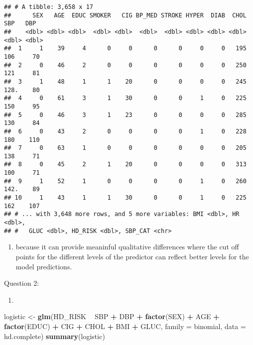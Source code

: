 \documentclass[
]{article}
\newenvironment{Shaded}{\begin{snugshade}}{\end{snugshade}}
\newcommand{\DataTypeTok}[1]{\textcolor[rgb]{0.13,0.29,0.53}{#1}}
\newcommand{\KeywordTok}[1]{\textcolor[rgb]{0.13,0.29,0.53}{\textbf{#1}}}
\newcommand{\NormalTok}[1]{#1}
\newcommand{\OperatorTok}[1]{\textcolor[rgb]{0.81,0.36,0.00}{\textbf{#1}}}
\newcommand{\StringTok}[1]{\textcolor[rgb]{0.31,0.60,0.02}{#1}}
\providecommand{\tightlist}{%
  \setlength{\itemsep}{0pt}\setlength{\parskip}{0pt}}
\begin{document}
\begin{verbatim}
## # A tibble: 3,658 x 17
##      SEX   AGE  EDUC SMOKER   CIG BP_MED STROKE HYPER  DIAB  CHOL   SBP   DBP
##    <dbl> <dbl> <dbl>  <dbl> <dbl>  <dbl>  <dbl> <dbl> <dbl> <dbl> <dbl> <dbl>
##  1     1    39     4      0     0      0      0     0     0   195  106     70
##  2     0    46     2      0     0      0      0     0     0   250  121     81
##  3     1    48     1      1    20      0      0     0     0   245  128.    80
##  4     0    61     3      1    30      0      0     1     0   225  150     95
##  5     0    46     3      1    23      0      0     0     0   285  130     84
##  6     0    43     2      0     0      0      0     1     0   228  180    110
##  7     0    63     1      0     0      0      0     0     0   205  138     71
##  8     0    45     2      1    20      0      0     0     0   313  100     71
##  9     1    52     1      0     0      0      0     1     0   260  142.    89
## 10     1    43     1      1    30      0      0     1     0   225  162    107
## # ... with 3,648 more rows, and 5 more variables: BMI <dbl>, HR <dbl>,
## #   GLUC <dbl>, HD_RISK <dbl>, SBP_CAT <chr>
\end{verbatim}

\begin{enumerate}
\def\labelenumi{\alph{enumi})}
\setcounter{enumi}{3}
\tightlist
\item
  because it can provide meaninful qualitative differences where the cut
  off points for the different levels of the predictor can reflect
  better levels for the model predictions.
\end{enumerate}

Question 2:

\begin{enumerate}
\def\labelenumi{\alph{enumi})}
\item
\end{enumerate}

\begin{Shaded}
\begin{Highlighting}[]
\NormalTok{logistic <-}\StringTok{  }\KeywordTok{glm}\NormalTok{(HD_RISK }\OperatorTok{~}\StringTok{ }\NormalTok{SBP }\OperatorTok{+}\StringTok{ }\NormalTok{DBP }\OperatorTok{+}\StringTok{ }\KeywordTok{factor}\NormalTok{(SEX) }\OperatorTok{+}\StringTok{ }\NormalTok{AGE }\OperatorTok{+}\StringTok{ }\KeywordTok{factor}\NormalTok{(EDUC) }\OperatorTok{+}\StringTok{ }\NormalTok{CIG }\OperatorTok{+}\StringTok{ }\NormalTok{CHOL }\OperatorTok{+}\StringTok{ }\NormalTok{BMI }\OperatorTok{+}\StringTok{ }\NormalTok{GLUC, }\DataTypeTok{family =}\NormalTok{ binomial, }\DataTypeTok{data =}\NormalTok{ hd.complete)}
\KeywordTok{summary}\NormalTok{(logistic)}
\end{Highlighting}
\end{Shaded}
\end{document}
